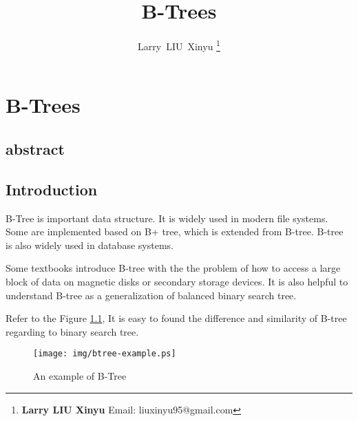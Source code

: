 \documentclass{article}
\begin{document}
\fi


\title{B-Trees}

\author{Larry~LIU~Xinyu
\thanks{{\bfseries Larry LIU Xinyu } \newline
  Email: liuxinyu95@gmail.com \newline}
  }


\maketitle

\ifx\wholebook\relax
\chapter{B-Trees}
\section{abstract}
\fi


\section{Introduction}
\label{introduction}

B-Tree is important data structure.
It is widely used in modern file systems. Some
are implemented based on B+ tree, which is extended from B-tree.
B-tree is also widely used in database systems.

Some textbooks introduce B-tree with the the problem of how to access a
large block of data on magnetic disks or secondary storage devices\cite{CLRS}.
It is also helpful to understand B-tree as a generalization of balanced binary
search tree\cite{wiki-b-tree}.

Refer to the Figure \ref{fig:btree-example}, It is easy to found the difference
and similarity of B-tree regarding to binary search tree.

\begin{figure}[htbp]
       \begin{center}
	\texttt{[image: img/btree-example.ps]}
        \caption{An example of B-Tree} \label{fig:btree-example}
       \end{center}
\end{figure}
\end{document}
